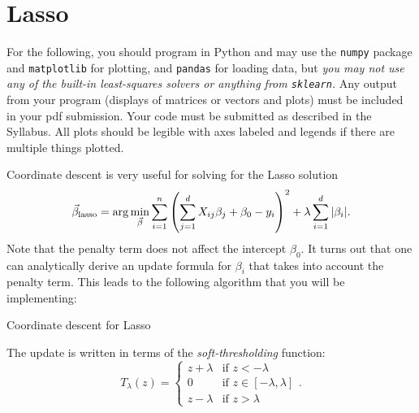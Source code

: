 \documentclass{article}
\begin{document}
\section*{Lasso}

For the following, you should program in Python and may use the
{\tt numpy} package and {\tt matplotlib} for plotting, and {\tt pandas} for loading data,
but {\em you may not use any of the built-in least-squares solvers or anything from 
{\tt sklearn}.}
Any output from your program (displays of matrices or vectors and plots) 
must be included in your pdf submission.
Your code must be submitted as described in the Syllabus.
All plots should be legible with axes labeled and legends if there are multiple things plotted.

\vspace{1em}
Coordinate descent is very useful for solving for the Lasso solution
\begin{equation*}
  \vec \beta_{\rm lasso} 
  = \arg \min_{\vec \beta} \sum_{i=1}^n \left(
    \sum_{j=1}^d X_{ij} \beta_j + \beta_0 - y_i \right)^2 
  + \lambda \sum_{i=1}^d | \beta_i |.
\end{equation*}
Note that the penalty term does not affect the intercept $\beta_0$.
It turns out that one can analytically derive an update formula
for $\beta_i$ that takes into account the penalty term.
This leads to the following algorithm that you will be implementing:
\begin{algorithm}[h]
  \caption{Coordinate descent for Lasso}
  \label{alg:lasso}
\end{algorithm}

The update is written in terms of the {\em soft-thresholding} function:
\begin{equation*}
T_\lambda(z) = \begin{cases}
          z + \lambda & \mbox{if } z < -\lambda \\
          0 & \mbox{if } z \in [-\lambda, \lambda] \\
          z - \lambda & \mbox{if } z > \lambda
        \end{cases}.
\end{equation*}
\end{document}
